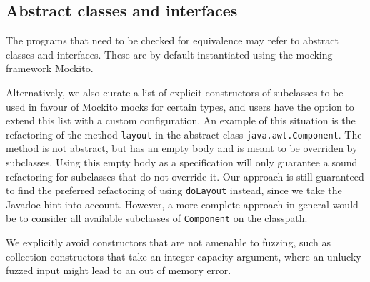 \documentclass[sigconf,review,anonymous]{acmart}
\begin{document}
\subsection{Abstract classes and interfaces}

The programs that need to be checked for equivalence may refer to
abstract classes and interfaces. These are by default instantiated
using the mocking framework Mockito.

Alternatively, we also curate a
list of explicit constructors
of subclasses to be used in favour of Mockito mocks for certain types, and users
have the option to extend this list with a custom configuration.
%
An example of this situation is the refactoring of the
method \texttt{layout} in the abstract class \texttt{java.awt.Component}. The
method is not abstract, but has an empty body and is meant to be overriden by
subclasses. Using this empty body as a specification will only guarantee a sound
refactoring for subclasses that do not override it. Our approach is still
guaranteed to find the preferred refactoring of using \texttt{doLayout} instead,
since we take the Javadoc hint into account. However, a more complete approach
in general would be to
consider all available subclasses of
\texttt{Component} on the classpath.

We explicitly avoid constructors that are not amenable to fuzzing, such as
collection constructors that take an integer capacity argument, where an
unlucky fuzzed input might lead to an out of memory error.





%
\end{document}
